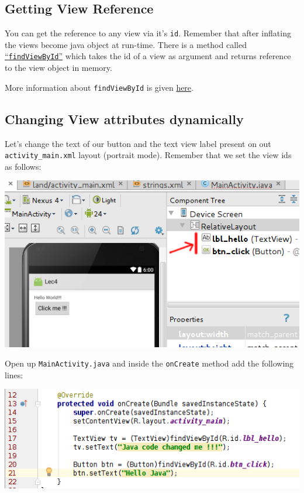\subsection{Getting View Reference}
You can get the reference to any view via it's \texttt{id}. Remember that after inflating the views become java object at run-time. There is a method called \underline{``\texttt{findViewById}''} which takes the id of a view as argument and returns reference to the view object in memory. 

More information about \texttt{findViewById} is given \href{https://developer.android.com/reference/android/view/View.html}{here}. \\

\subsection{Changing View attributes dynamically}
Let's change the text of our button and the text view label present on out \texttt{activity\_main.xml} layout (portrait mode). Remember that we set the view ids as follows:

\begin{center}
	\includegraphics[scale=0.4]{chapters/ch04/images/44}
\end{center}

Open up \texttt{MainActivity.java} and inside the \texttt{onCreate} method add the following lines:

\begin{center}
	\includegraphics[scale=0.4]{chapters/ch04/images/45}
\end{center}


